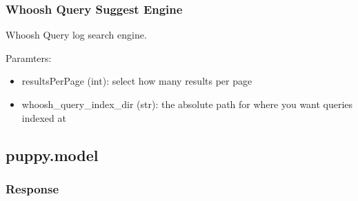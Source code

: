 \documentclass[letterpaper,10pt,english]{sphinxmanual}
\begin{document}
\subsubsection{Whoosh Query Suggest Engine}
\label{api2.0:module-puppy.search.engine.whooshQuerySuggestEngine}\label{api2.0:whoosh-query-suggest-engine}

\begin{fulllineitems}
\label{api2.0:puppy.search.engine.whooshQuerySuggestEngine.WhooshQuerySuggestEngine}
Whoosh Query log search engine.

Paramters:
\begin{itemize}
\item {} 
resultsPerPage (int): select how many results per page

\item {} 
whoosh\_query\_index\_dir (str): the absolute path for where you want queries indexed at

\end{itemize}

\end{fulllineitems}



\subsection{puppy.model}
\label{api2.0:puppy-model}\label{api2.0:module-puppy.model}

\subsubsection{Response}
\label{api2.0:puppy-response}\label{api2.0:response}
\end{document}
